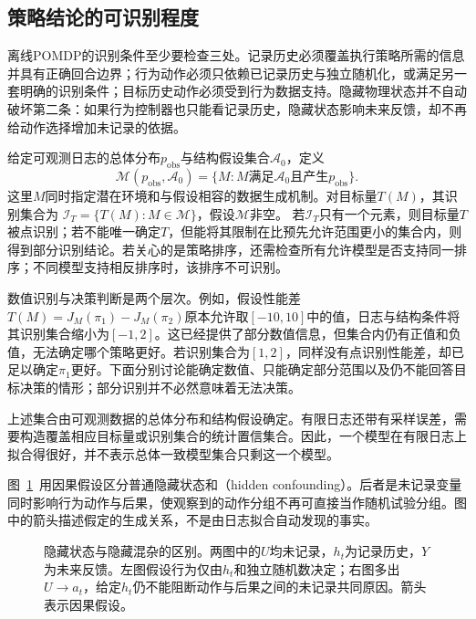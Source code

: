 \subsection{策略结论的可识别程度}
\label{sec:rl-information-identification-levels}

离线POMDP的识别条件至少要检查三处。记录历史必须覆盖执行策略所需的信息并具有正确回合边界；行为动作必须只依赖已记录历史与独立随机化，或满足另一套明确的识别条件；目标历史动作必须受到行为数据支持。隐藏物理状态并不自动破坏第二条：如果行为控制器也只能看记录历史，隐藏状态影响未来反馈，却不再给动作选择增加未记录的依据。

\begin{definition}[一致模型集合与识别集合]
  \label{def:rl-information-identified-set}
  给定可观测日志的总体分布$p_{\mathrm{obs}}$与结构假设集合$\mathcal A_0$，定义
  \[
    \mathcal M(p_{\mathrm{obs}},\mathcal A_0)
       =\{M:M\text{满足}\mathcal A_0
                  \text{且产生}p_{\mathrm{obs}}\}.
  \]
  这里$M$同时指定潜在环境和与假设相容的数据生成机制。对目标量$T(M)$，其识别集合为
  $\mathcal I_T=\{T(M):M\in\mathcal M\}$，假设$\mathcal M$非空。
  若$\mathcal I_T$只有一个元素，则目标量$T$被点识别；若不能唯一确定$T$，但能将其限制在比预先允许范围更小的集合内，则得到部分识别结论。若关心的是策略排序，还需检查所有允许模型是否支持同一排序；不同模型支持相反排序时，该排序不可识别。
\end{definition}

数值识别与决策判断是两个层次。例如，假设性能差$T(M)=J_M(\pi_1)-J_M(\pi_2)$原本允许取$[-10,10]$中的值，日志与结构条件将其识别集合缩小为$[-1,2]$。这已经提供了部分数值信息，但集合内仍有正值和负值，无法确定哪个策略更好。若识别集合为$[1,2]$，同样没有点识别性能差，却已足以确定$\pi_1$更好。下面分别讨论能确定数值、只能确定部分范围以及仍不能回答目标决策的情形；部分识别并不必然意味着无法决策。

上述集合由可观测数据的总体分布和结构假设确定。有限日志还带有采样误差，需要构造覆盖相应目标量或识别集合的统计置信集合。因此，一个模型在有限日志上拟合得很好，并不表示总体一致模型集合只剩这一个模型。

图~\ref{fig:rl-information-confounding}~用因果假设区分普通隐藏状态和（hidden confounding）。后者是未记录变量同时影响行为动作与后果，使观察到的动作分组不再可直接当作随机试验分组。图中的箭头描述假定的生成关系，不是由日志拟合自动发现的事实。

\begin{figure}[htbp]
  \centering
  
  \caption{隐藏状态与隐藏混杂的区别。两图中的$U$均未记录，$h_t$为记录历史，$Y$为未来反馈。左图假设行为仅由$h_t$和独立随机数决定；右图多出$U\to a_t$，给定$h_t$仍不能阻断动作与后果之间的未记录共同原因。箭头表示因果假设。}
  \label{fig:rl-information-confounding}
\end{figure}

